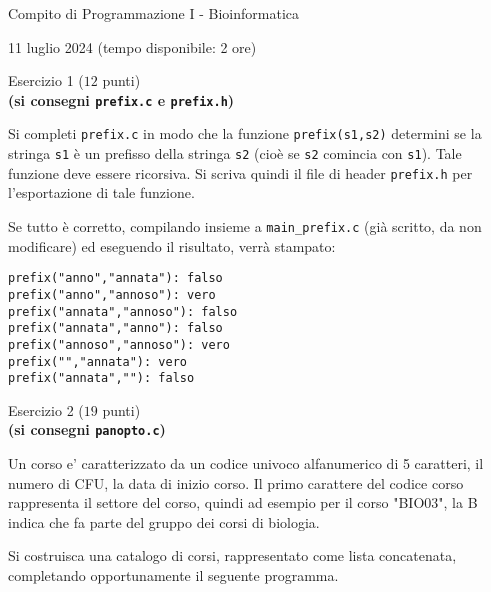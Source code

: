 \documentclass[12pt]{article}
\begin{document}
\begin{center}{\LARGE Compito di Programmazione I - Bioinformatica}\\
\begin{center}
  \large 11 luglio 2024 (tempo disponibile: 2 ore)
\end{center}
\end{center}

\vspace*{1ex}
\begin{center}{\Large Esercizio 1} ($12$ punti)\\
  \textbf{(si consegni \texttt{prefix.c} e \texttt{prefix.h})}
\end{center}

Si completi \texttt{prefix.c} in modo che la funzione \texttt{prefix(s1,s2)} determini
se la stringa \texttt{s1} \`e un prefisso della stringa \texttt{s2}
(cio\`e se \texttt{s2} comincia con \texttt{s1}).
Tale funzione deve essere ricorsiva.
Si scriva quindi il file di header \texttt{prefix.h} per l'esportazione di tale funzione.

Se tutto \`e corretto, compilando insieme a \texttt{main\_prefix.c} (gi\`a scritto, da non
modificare) ed ese\-guendo il risultato, verr\`a stampato:

\begin{mdframed}[backgroundcolor=verylightgray] 
\begin{verbatim}
prefix("anno","annata"): falso
prefix("anno","annoso"): vero
prefix("annata","annoso"): falso
prefix("annata","anno"): falso
prefix("annoso","annoso"): vero
prefix("","annata"): vero
prefix("annata",""): falso
\end{verbatim}
\end{mdframed}

\vspace*{1ex}
\begin{center}{\Large Esercizio 2} ($19$ punti)\\
  \textbf{(si consegni \texttt{panopto.c})}
\end{center}
Un corso e' caratterizzato da un codice univoco alfanumerico di 5 caratteri, il numero di CFU, la data di inizio corso.
Il primo carattere del codice corso rappresenta il settore del corso, quindi ad esempio per il corso "BIO03", la B indica che fa parte del gruppo dei corsi di biologia.

Si costruisca una catalogo di corsi, rappresentato come lista concatenata, completando opportunamente il seguente programma.
\end{document}
